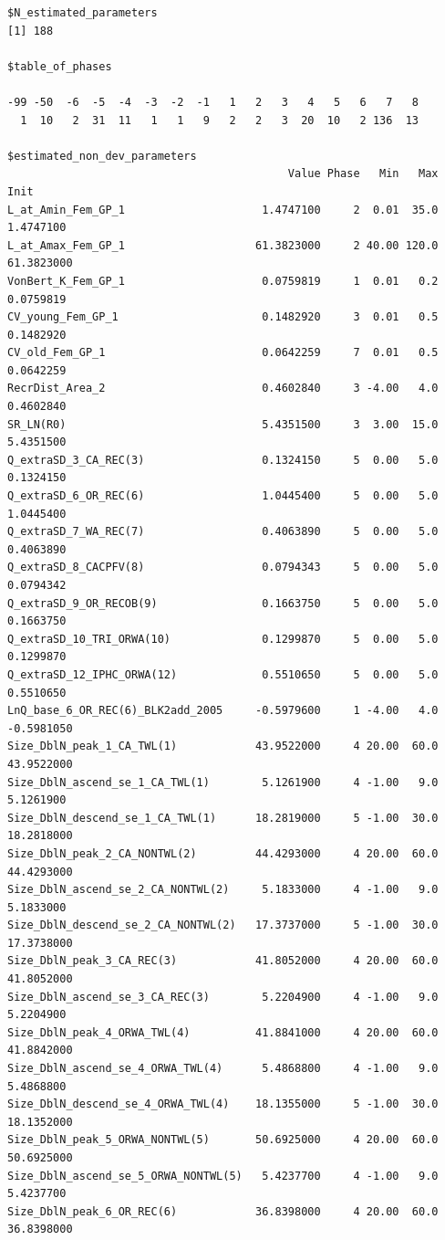 \documentclass[
]{scrartcl}
\begin{document}
\begin{verbatim}
$N_estimated_parameters
[1] 188

$table_of_phases

-99 -50  -6  -5  -4  -3  -2  -1   1   2   3   4   5   6   7   8 
  1  10   2  31  11   1   1   9   2   2   3  20  10   2 136  13 

$estimated_non_dev_parameters
                                           Value Phase   Min   Max       Init
L_at_Amin_Fem_GP_1                     1.4747100     2  0.01  35.0  1.4747100
L_at_Amax_Fem_GP_1                    61.3823000     2 40.00 120.0 61.3823000
VonBert_K_Fem_GP_1                     0.0759819     1  0.01   0.2  0.0759819
CV_young_Fem_GP_1                      0.1482920     3  0.01   0.5  0.1482920
CV_old_Fem_GP_1                        0.0642259     7  0.01   0.5  0.0642259
RecrDist_Area_2                        0.4602840     3 -4.00   4.0  0.4602840
SR_LN(R0)                              5.4351500     3  3.00  15.0  5.4351500
Q_extraSD_3_CA_REC(3)                  0.1324150     5  0.00   5.0  0.1324150
Q_extraSD_6_OR_REC(6)                  1.0445400     5  0.00   5.0  1.0445400
Q_extraSD_7_WA_REC(7)                  0.4063890     5  0.00   5.0  0.4063890
Q_extraSD_8_CACPFV(8)                  0.0794343     5  0.00   5.0  0.0794342
Q_extraSD_9_OR_RECOB(9)                0.1663750     5  0.00   5.0  0.1663750
Q_extraSD_10_TRI_ORWA(10)              0.1299870     5  0.00   5.0  0.1299870
Q_extraSD_12_IPHC_ORWA(12)             0.5510650     5  0.00   5.0  0.5510650
LnQ_base_6_OR_REC(6)_BLK2add_2005     -0.5979600     1 -4.00   4.0 -0.5981050
Size_DblN_peak_1_CA_TWL(1)            43.9522000     4 20.00  60.0 43.9522000
Size_DblN_ascend_se_1_CA_TWL(1)        5.1261900     4 -1.00   9.0  5.1261900
Size_DblN_descend_se_1_CA_TWL(1)      18.2819000     5 -1.00  30.0 18.2818000
Size_DblN_peak_2_CA_NONTWL(2)         44.4293000     4 20.00  60.0 44.4293000
Size_DblN_ascend_se_2_CA_NONTWL(2)     5.1833000     4 -1.00   9.0  5.1833000
Size_DblN_descend_se_2_CA_NONTWL(2)   17.3737000     5 -1.00  30.0 17.3738000
Size_DblN_peak_3_CA_REC(3)            41.8052000     4 20.00  60.0 41.8052000
Size_DblN_ascend_se_3_CA_REC(3)        5.2204900     4 -1.00   9.0  5.2204900
Size_DblN_peak_4_ORWA_TWL(4)          41.8841000     4 20.00  60.0 41.8842000
Size_DblN_ascend_se_4_ORWA_TWL(4)      5.4868800     4 -1.00   9.0  5.4868800
Size_DblN_descend_se_4_ORWA_TWL(4)    18.1355000     5 -1.00  30.0 18.1352000
Size_DblN_peak_5_ORWA_NONTWL(5)       50.6925000     4 20.00  60.0 50.6925000
Size_DblN_ascend_se_5_ORWA_NONTWL(5)   5.4237700     4 -1.00   9.0  5.4237700
Size_DblN_peak_6_OR_REC(6)            36.8398000     4 20.00  60.0 36.8398000

\end{verbatim}
\end{document}
